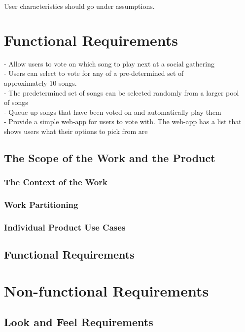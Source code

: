 \documentclass[12pt, titlepage]{article}
\begin{document}
User characteristics should go under assumptions.

\section{Functional Requirements}

- Allow users to vote on which song to play next at a social gathering \\
- Users can select to vote for any of a pre-determined set of \\
  approximately 10 songs. \\
- The predetermined set of songs can be selected randomly from a larger pool \\
  of songs \\
- Queue up songs that have been voted on and automatically play them \\
- Provide a simple web-app for users to vote with. The web-app has a list that
  shows users what their options to pick from are \\

\subsection{The Scope of the Work and the Product}

\subsubsection{The Context of the Work}

\subsubsection{Work Partitioning}

\subsubsection{Individual Product Use Cases}

\subsection{Functional Requirements}

\section{Non-functional Requirements}

\subsection{Look and Feel Requirements}
\end{document}
